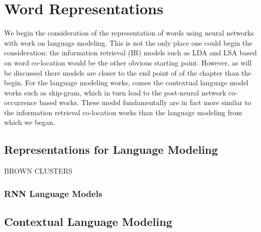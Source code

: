 \documentclass[12pt,parskip]{komatufte}
\begin{document}
\chapter{Word Representations}\label{sec:word-representations}


We begin the consideration of the representation of words using neural networks with work on language modeling.
This is not the only place one could begin the consideration: the information retrieval (IR) models such as LDA and LSA based on word co-location would be the other obvious starting point.
However, as will be discussed there models are closer to the end point of of the chapter than the begin.
For the language modeling works, comes the contextual language model works such as skip-gram, which in turn lead to the post-neural network co-occurrence based works.
These model fundamentally are in fact more similar to the information retrieval co-location works than the language modeling from which we began.


\section{Representations for Language Modeling}
BROWN CLUSTERS




\subsection{RNN Language Models}

\section{Contextual Language Modeling}

\end{document}
